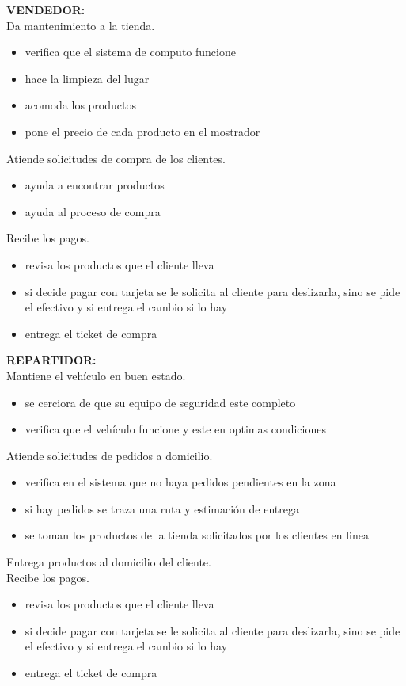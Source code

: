 \documentclass[spanish,12pt,letterpapper]{article}
\begin{document}
	\textbf{VENDEDOR:\\}
	Da mantenimiento a la tienda.
	\begin{itemize}
	\item verifica que el sistema de computo funcione
	\item hace la limpieza del lugar
	\item acomoda los productos
	\item pone el precio de cada producto en el mostrador\\
	\end{itemize}
	Atiende solicitudes de compra de los clientes.
	\begin{itemize}
	\item ayuda a encontrar productos
	\item ayuda al proceso de compra\\
	\end{itemize}
	Recibe los pagos.
	\begin{itemize}
	\item revisa los productos que el cliente lleva
	\item si decide pagar con tarjeta se le solicita al cliente para deslizarla, sino se pide el efectivo y si entrega el cambio si lo hay
	\item entrega el ticket de compra\\
	\end{itemize}
	
	\textbf{REPARTIDOR:\\}
	Mantiene el vehículo en buen estado.
	\begin{itemize}
	\item se cerciora de que su equipo de seguridad este completo
	\item verifica que el vehículo funcione y este en optimas condiciones\\
	\end{itemize}
	Atiende solicitudes de pedidos a domicilio.
	\begin{itemize}
	\item verifica en el sistema que no haya pedidos pendientes en la zona
	\item si hay pedidos se traza una ruta y estimación de entrega
	\item se toman los productos de la tienda solicitados por los clientes en linea\\
	\end{itemize}
	Entrega productos al domicilio del cliente.\\
	Recibe los pagos.
	\begin{itemize}
	\item revisa los productos que el cliente lleva
	\item si decide pagar con tarjeta se le solicita al cliente para deslizarla, sino se pide el efectivo y si entrega el cambio si lo hay
	\item entrega el ticket de compra\\
	\end{itemize}
	
\end{document}
